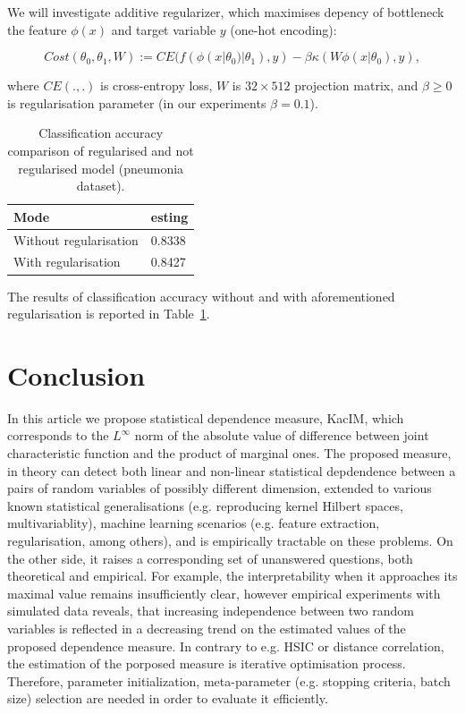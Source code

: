 \documentclass{article}
\begin{document}
We will investigate additive regularizer, which maximises depency of bottleneck the feature $\phi(x)$ and target variable $y$ (one-hot encoding): 


\begin{equation}
Cost(\theta_{0},\theta_{1}, W) := CE(f(\phi(x|\theta_{0})|\theta_{1}),y) - \beta \kappa(W\phi(x|\theta_{0}),y),
\end{equation}

\noindent where $CE(.,.)$ is cross-entropy loss, $W$ is $32\times 512$ projection matrix, and $\beta \geq 0$ is regularisation parameter (in our experiments $\beta = 0.1$).

\begin{table}	
	\centering
	\begin{tabular}{ |p{4cm}|p{2cm}|}
		\hline
		Mode & esting  \\
		\hline
		Without regularisation   &    0.8338 \\		
		\hline
		With regularisation  &   0.8427 \\		
		\hline
	\end{tabular}
	\caption{Classification accuracy comparison of regularised and not regularised model (pneumonia dataset).  }
	\label{table:regularisation_classification_accuracies}	
\end{table}

The results of classification accuracy without and with aforementioned regularisation is reported in Table~\ref{table:regularisation_classification_accuracies}.


\section{Conclusion} 

\label{section:conclusion}
In this article we propose statistical dependence measure, KacIM, which corresponds to the $L^{\infty}$ norm of the absolute value of difference between joint characteristic function and the product of marginal ones. The proposed measure, in theory can detect both linear and non-linear statistical depdendence between a pairs of random variables of possibly different dimension, extended to various known statistical generalisations (e.g. reproducing kernel Hilbert spaces, multivariablity), machine learning scenarios (e.g. feature extraction, regularisation, among others), and is empirically tractable on these problems. On the other side, it raises a corresponding set of unanswered questions, both theoretical and empirical. For example, the interpretability when it approaches its maximal value remains insufficiently clear, however empirical experiments with simulated data reveals, that increasing independence between two random variables is reflected in a decreasing trend on the estimated values of the proposed dependence measure. In contrary to e.g. HSIC or distance correlation, the estimation of the porposed measure is iterative optimisation process. Therefore, parameter initialization, meta-parameter (e.g. stopping criteria, batch size) selection are needed in order to evaluate it efficiently.
\end{document}
